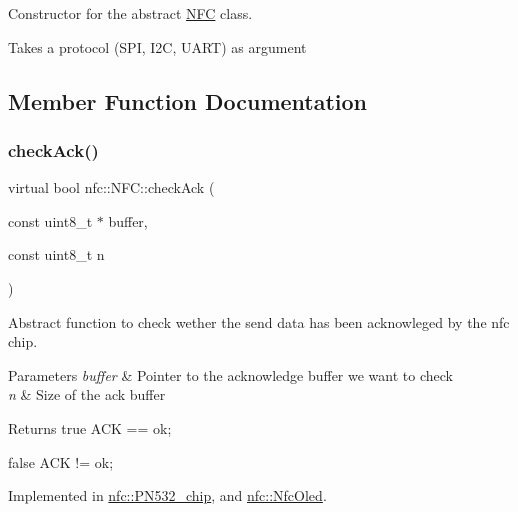 Constructor for the abstract \hyperlink{classnfc_1_1NFC}{N\+FC} class. 

Takes a protocol (S\+PI, I2C, U\+A\+RT) as argument 

\subsection{Member Function Documentation}
\mbox{\label{classnfc_1_1NFC_a9d859ed12251d6d553d9f5c09bbb10ef}} 
\subsubsection{\texorpdfstring{check\+Ack()}{checkAck()}}
{\footnotesize\ttfamily virtual bool nfc\+::\+N\+F\+C\+::check\+Ack (\begin{DoxyParamCaption}\item[{const uint8\+\_\+t $\ast$}]{buffer,  }\item[{const uint8\+\_\+t}]{n }\end{DoxyParamCaption})\hspace{0.3cm}{\ttfamily [pure virtual]}}



Abstract function to check wether the send data has been acknowleged by the nfc chip. 


\begin{DoxyParams}{Parameters}
{\em buffer} & Pointer to the acknowledge buffer we want to check \\
\hline
{\em n} & Size of the ack buffer \\
\hline
\end{DoxyParams}
\begin{DoxyReturn}{Returns}
true A\+CK == ok; 

false A\+CK != ok; 
\end{DoxyReturn}


Implemented in \hyperlink{classnfc_1_1PN532__chip_a631fa2690b45119c7bbb99e07f41b464}{nfc\+::\+P\+N532\+\_\+chip}, and \hyperlink{classnfc_1_1NfcOled_abac578b4b4a7b4a4c58dbfd4e89a6bf3}{nfc\+::\+Nfc\+Oled}.

\mbox{\label{classnfc_1_1NFC_a72523a6c0afdb3f695a64e46fd6d2213}} 
